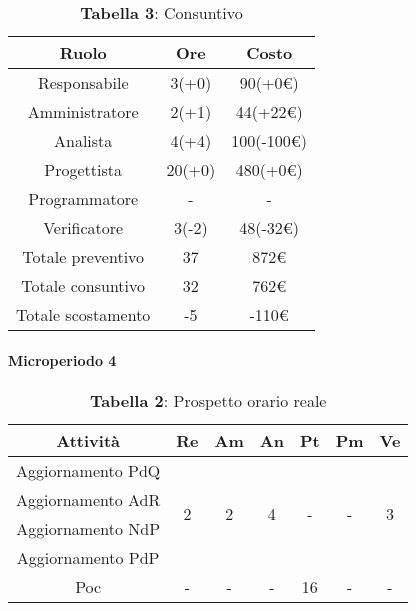 \begin{table}[H]
	\centering
	\renewcommand{\arraystretch}{1.5}
	\begin{tabular}{|c|c|c|}
		\hline
		\rowcolor{lighter-grayer}
		Ruolo & Ore & Costo \\ \hline
		Responsabile & 3(+0) & 90(+0\euro) \\ \hline
		Amministratore & 2(+1) & 44(+22\euro) \\ \hline
		Analista & 4(+4) & 100(-100\euro) \\ \hline
		Progettista & 20(+0) & 480(+0\euro) \\ \hline
		Programmatore & - & - \\ \hline
		Verificatore & 3(-2) & 48(-32\euro) \\ \hline
		Totale preventivo & 37 & 872\euro \\ \hline
		Totale consuntivo & 32 & 762\euro \\ \hline
		Totale scostamento & -5 & -110\euro \\ \hline
	\end{tabular}
	\caption*{\textbf{Tabella 3}: Consuntivo\\}
\end{table}

\paragraph{Microperiodo 4}
\begin{table}[H]
	\centering
	\begin{tabular}{|c|c|c|c|c|c|c|}
		\hline
		\rowcolor{lighter-grayer}
		\textbf{Attività} & \textbf{Re}        & \textbf{Am}        & \textbf{An}        & \textbf{Pt}        & \textbf{Pm}        & \textbf{Ve}        \\ \hline
		Aggiornamento PdQ & \multirow{4}{*}{2} & \multirow{4}{*}{2} & \multirow{4}{*}{4} & \multirow{4}{*}{-} & \multirow{4}{*}{-} & \multirow{4}{*}{3} \\ \cline{1-1}
		Aggiornamento AdR &                    &                    &                    &                    &                    &                    \\ \cline{1-1}
		Aggiornamento NdP &                    &                    &                    &                    &                    &                    \\ \cline{1-1}
		Aggiornamento PdP &                    &                    &                    &                    &                    &                    \\ \hline
		Poc               & -                  & -                  & -                  & 16                 & -                  & -                  \\ \hline
	\end{tabular}
\caption*{\textbf{Tabella 2}: Prospetto orario reale\\}
\end{table}

